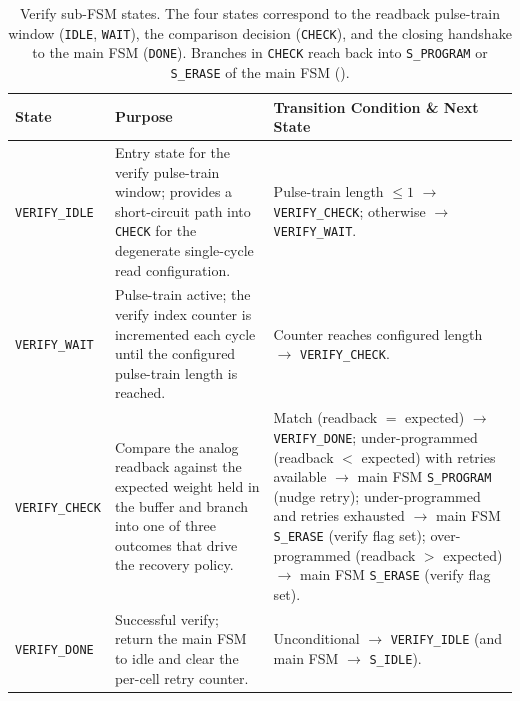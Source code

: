 \begin{table}[h]
    \centering
    \caption{Verify sub-FSM states. The four states correspond to the
        readback pulse-train window (\texttt{IDLE}, \texttt{WAIT}), the
        comparison decision (\texttt{CHECK}), and the closing
        handshake to the main FSM (\texttt{DONE}). Branches in
        \texttt{CHECK} reach back into \texttt{S\_PROGRAM} or
        \texttt{S\_ERASE} of the main FSM
        ().}
    \label{tab:verify-fsm-states}
    \begin{tabularx}{\linewidth}{l X X}
        \toprule
        \textbf{State} & \textbf{Purpose} &
            \textbf{Transition Condition \& Next State} \\
        \midrule
        \texttt{VERIFY\_IDLE} &
            Entry state for the verify pulse-train window; provides a
            short-circuit path into \texttt{CHECK} for the degenerate
            single-cycle read configuration. &
            Pulse-train length $\le 1$ $\rightarrow$
            \texttt{VERIFY\_CHECK}; otherwise $\rightarrow$
            \texttt{VERIFY\_WAIT}. \\
        \texttt{VERIFY\_WAIT} &
            Pulse-train active; the verify index counter is incremented
            each cycle until the configured pulse-train length is
            reached. &
            Counter reaches configured length $\rightarrow$
            \texttt{VERIFY\_CHECK}. \\
        \texttt{VERIFY\_CHECK} &
            Compare the analog readback against the expected weight
            held in the buffer and branch into one of three outcomes
            that drive the recovery policy. &
            Match (readback $=$ expected) $\rightarrow$
            \texttt{VERIFY\_DONE};
            under-programmed (readback $<$ expected) with retries
            available $\rightarrow$ main FSM \texttt{S\_PROGRAM} (nudge
            retry);
            under-programmed and retries
            exhausted $\rightarrow$ main FSM \texttt{S\_ERASE} (verify
            flag set);
            over-programmed (readback $>$ expected) $\rightarrow$ main
            FSM \texttt{S\_ERASE} (verify flag set). \\
        \texttt{VERIFY\_DONE} &
            Successful verify; return the main FSM to idle and clear
            the per-cell retry counter. &
            Unconditional $\rightarrow$ \texttt{VERIFY\_IDLE} (and main
            FSM $\rightarrow$ \texttt{S\_IDLE}). \\
        \bottomrule
    \end{tabularx}
\end{table}

